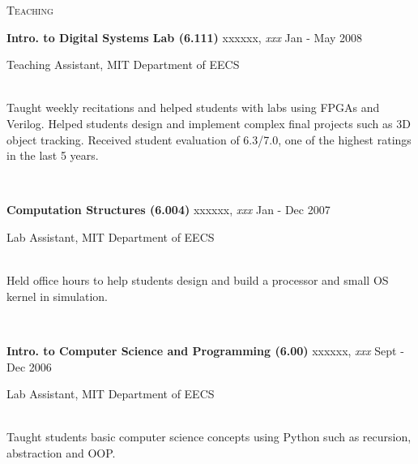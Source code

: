 \documentclass[10pt,times]{report}
\newlength{\sectiongap}
\newlength{\entrygap}
\newlength{\sectioncolwidth}
\newlength{\colgap}
\newlength{\stuffwidth}
\def\ifEqString#1#2{\def\testa{#1}\def\testb{#2}%
  \ifx\testa\testb}
\newenvironment{rtable}{
  \begin{minipage}{\textwidth}
  }{
  \end{minipage}
}
\newenvironment{rentry}[3][xxx]{
  \begin{minipage}[t]{\hsize}
    \textbf{#2}\ifEqString{#1}{xxx}\relax\else, \textit{#1}\fi
    \hspace{\stretch{1}} #3 \\
  }{
    \removelastskip
  \end{minipage}
  \\[\entrygap]  %
}
\newcommand{\rline}[2]{
  \begin{minipage}[t]{\hsize}
    #1 \hspace{\stretch{1}} #2
  \end{minipage} \\
}
\newenvironment{rsection}[1]{
  \begin{minipage}[t]{\sectioncolwidth}
    \textsc{#1}
  \end{minipage}
  \hspace{\colgap}
  \begin{minipage}[t]{\stuffwidth}
  }{
    \removelastskip
  \end{minipage}
  \\[\sectiongap]
}
\begin{document}
\begin{rtable}
\begin{rsection}{Teaching}
    \begin{rentry}{Intro. to Digital Systems Lab (6.111)}{Jan - May
        2008}
      \rline{Teaching Assistant, MIT Department of EECS}{} 
      Taught weekly recitations and helped students with labs using
      FPGAs and Verilog. Helped students design and implement complex
      final projects such as 3D object tracking. Received student
      evaluation of 6.3/7.0, one of the highest ratings in the last 5
      years.
    \end{rentry}    

    \begin{rentry}{Computation Structures (6.004)}{Jan - Dec 2007}
      \rline{Lab Assistant, MIT Department of EECS}{} 
      Held office hours to help students design and build a processor
      and small OS kernel in simulation.
    \end{rentry}

    \begin{rentry}{Intro. to Computer Science and
        Programming (6.00)}{Sept - Dec 2006}
      \rline{Lab Assistant, MIT Department of EECS}{} 
      Taught students basic computer science concepts using Python
      such as recursion, abstraction and OOP.
    \end{rentry}
  \end{rsection}


\end{rtable}
\end{document}
